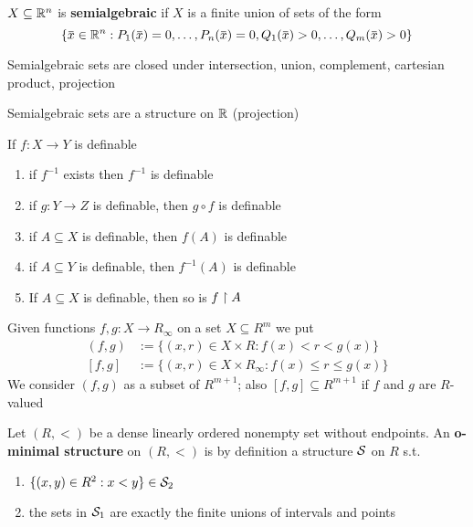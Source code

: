 \documentclass[11pt]{article}
\begin{document}
\begin{definition}[]
\(X\subseteq\mathbb{R}^n\) is \textbf{semialgebraic} if \(X\) is a finite union of sets of the form
\begin{equation*}
\{\barx\in\R^n:P_1(\barx)=0,\dots,P_n(\barx)=0,Q_1(\barx)> 0,\dots,Q_m(\barx)>0\}
\end{equation*}
\end{definition}

Semialgebraic sets are closed under intersection, union, complement, cartesian product, projection

\begin{fact}
Semialgebraic sets are a structure on \(\mathbb{R}\) (projection)
\end{fact}

\begin{fact}[]
If \(f:X\to Y\) is definable
\begin{enumerate}
\item if \(f^{-1}\) exists then \(f^{-1}\) is definable
\item if \(g:Y\to Z\) is definable, then \(g\circ f\) is definable
\item if \(A\subseteq X\) is definable, then \(f(A)\) is definable
\item if \(A\subseteq Y\) is definable, then \(f^{-1}(A)\) is definable
\item If \(A\subseteq X\) is definable, then so is \(f\upharpoonright A\)
\end{enumerate}
\end{fact}

Given functions \(f,g:X\to R_\infty\) on a set \(X\subseteq R^m\) we put
\begin{align*}
(f,g)&:=\{(x,r)\in X\times R:f(x)<r<g(x)\}\\
[f,g]&:=\{(x,r)\in X\times R_\infty:f(x)\le r\le g(x)\}
\end{align*}
We consider \((f,g)\) as a subset of \(R^{m+1}\); also \([f,g]\subseteq R^{m+1}\) if \(f\) and \(g\) are \(R\)-valued

\begin{definition}[]
Let \((R,<)\) be a dense linearly ordered nonempty set without endpoints. An \textbf{o-minimal structure}
on \((R,<)\) is by definition a structure \(\mathcal{S}\) on \(R\) s.t.
\begin{enumerate}
\item \(\{(x,y)\in R^2:x<y\}\in\mathcal{S}_2\)
\item the sets in \(\mathcal{S}_1\) are exactly the finite unions of intervals and points
\end{enumerate}
\end{definition}
\end{document}
